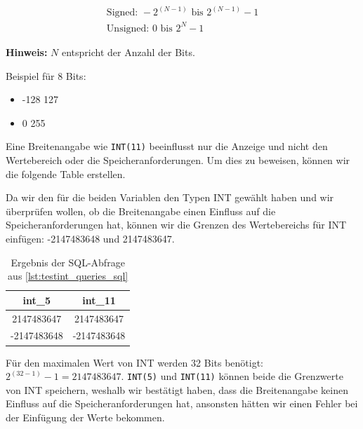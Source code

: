 \vspace{-4mm}
\begin{gather}
    \text{Signed: } -2^{(N-1)} \text{ bis } 2^{(N-1)} - 1\label{eq:equation-signed} \\
    \text{Unsigned: } 0 \text{ bis } 2^N - 1\label{eq:equation-unsigned}
\end{gather}

\textbf{Hinweis:} $N$ entspricht der Anzahl der Bits.
\vspace{4pt}

Beispiel für 8 Bits:
\begin{itemize}
    \item {} -128  127
    \item {} 0  255
\end{itemize}

Eine Breitenangabe wie \texttt{INT(11)} beeinflusst nur die Anzeige und nicht den Wertebereich oder die Speicheranforderungen.
Um dies zu beweisen, können wir die folgende Table erstellen.



Da wir den für die beiden Variablen den Typen INT gewählt haben und wir überprüfen wollen, ob die Breitenangabe einen Einfluss auf die Speicheranforderungen hat, können wir die Grenzen des Wertebereichs für INT einfügen: -2147483648 und 2147483647.


\begin{table}[h!]
    \centering
    \caption{Ergebnis der SQL-Abfrage aus \ref{lst:testint_queries_sql}}
    \begin{tabular}{|c|c|}
        \hline
        \textbf{int\_5} & \textbf{int\_11} \\ \hline
        2147483647 & 2147483647 \\ \hline
        -2147483648 & -2147483648 \\ \hline
    \end{tabular}
    \label{tab:int_values}
\end{table}
Für den maximalen Wert von INT werden 32 Bits benötigt: $2^{(32-1)} - 1 = 2147483647$.
\texttt{INT(5)} und \texttt{INT(11)} können beide die Grenzwerte von INT speichern, weshalb wir bestätigt haben, dass die Breitenangabe keinen Einfluss auf die Speicheranforderungen hat, ansonsten hätten wir einen Fehler bei der Einfügung der Werte bekommen.

